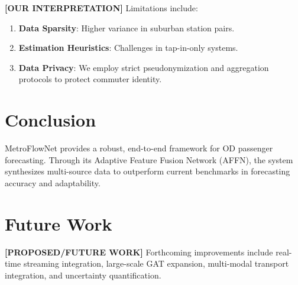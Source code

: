 \documentclass[conference]{IEEEtran}
\begin{document}
\noindent \textbf{[OUR INTERPRETATION]} Limitations include:
\begin{enumerate}
    \item \textbf{Data Sparsity}: Higher variance in suburban station pairs.
    \item \textbf{Estimation Heuristics}: Challenges in tap-in-only systems.
    \item \textbf{Data Privacy}: We employ strict pseudonymization and aggregation protocols to protect commuter identity.
\end{enumerate}

\section{Conclusion}
\label{sec:conclusion}

MetroFlowNet provides a robust, end-to-end framework for OD passenger forecasting. Through its Adaptive Feature Fusion Network (AFFN), the system synthesizes multi-source data to outperform current benchmarks in forecasting accuracy and adaptability.

\section{Future Work}
\label{sec:future_work}

\noindent \textbf{[PROPOSED/FUTURE WORK]} Forthcoming improvements include real-time streaming integration, large-scale GAT expansion, multi-modal transport integration, and uncertainty quantification.
\end{document}
